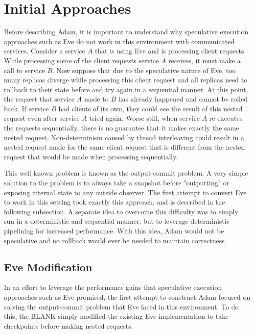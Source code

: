 \documentclass[11pt, oneside]{report}
\begin{document}
\section{Initial Approaches}

Before describing Adam, it is important to understand why speculative execution approaches such as Eve do not work in this environment with communicated services. Consider a service $A$ that is using Eve and is processing client requests. While processing some of the client requests service $A$ receives, it must make a call to service $B$. Now suppose that due to the speculative nature of Eve, too many replicas diverge while processing this client request and all replicas need to rollback to their state before and try again in a sequential manner. At this point, the request that service $A$ made to $B$ has already happened and cannot be rolled back. If service $B$ had clients of its own, they could see the result of this nested request even after service $A$ tried again. Worse still, when service $A$ re-executes the requests sequentially, there is no guarantee that it makes exactly the same nested request. Non-determinism caused by thread interleaving could result in a nested request made for the same client request that is different from the nested request that would be made when processing sequentially.

This well known problem is known as the output-commit problem. A very simple solution to the problem is to always take a snapshot before "outputting" or exposing internal state to any outside observer. The first attempt to convert Eve to work in this setting took exactly this approach, and is described in the following subsection. A separate idea to overcome this difficulty was to simply run in a deterministic and sequential manner, but to leverage deterministic pipelining for increased performance. With this idea, Adam would not be speculative and no rollback would ever be needed to maintain correctness.

\subsection{Eve Modification}

In an effort to leverage the performance gains that speculative execution approaches such as Eve promised, the first attempt to construct Adam focused on solving the output-commit problem that Eve faced in this environment. To do this, the 
BLANK %
simply modified the existing Eve implementation to take checkpoints before making nested requests. 
\end{document}
